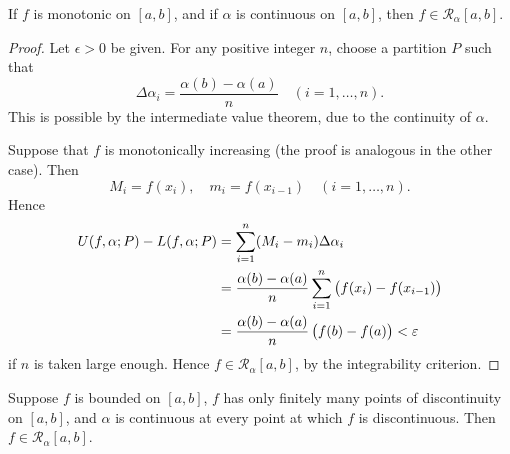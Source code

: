 \begin{proposition}
If $f$ is monotonic on $[a,b]$, and if $\alpha$ is continuous on $[a,b]$, then $f\in\mathcal{R}_\alpha[a,b]$.
\end{proposition}

\begin{proof}
Let $\epsilon>0$ be given. For any positive integer $n$, choose a partition $P$ such that
\[\Delta\alpha_i=\frac{\alpha(b)-\alpha(a)}{n}\quad(i=1,\dots,n).\]
This is possible by the intermediate value theorem, due to the continuity of $\alpha$.

Suppose that $f$ is monotonically increasing (the proof is analogous in the other case). Then
\[M_i=f(x_i),\quad m_i=f(x_{i-1})\quad(i=1,\dots,n).\]
Hence
\begin{align*}
U(f,\alpha;P)-L(f,\alpha;P)
&=\sum_{i=1}^{n}(M_i-m_i)\Delta\alpha_i\\
&=\frac{\alpha(b)-\alpha(a)}{n}\sum_{i=1}^{n}\left(f(x_i)-f(x_{i-1})\right)\\
&=\frac{\alpha(b)-\alpha(a)}{n}\left(f(b)-f(a)\right)<\varepsilon
\end{align*}
if $n$ is taken large enough. Hence $f\in\mathcal{R}_\alpha[a,b]$, by the integrability criterion.
\end{proof}

\begin{proposition}
Suppose $f$ is bounded on $[a,b]$, $f$ has only finitely many points of discontinuity on $[a,b]$, and $\alpha$ is continuous at every point at which $f$ is discontinuous. Then $f\in \mathcal{R}_\alpha[a,b]$.
\end{proposition}

